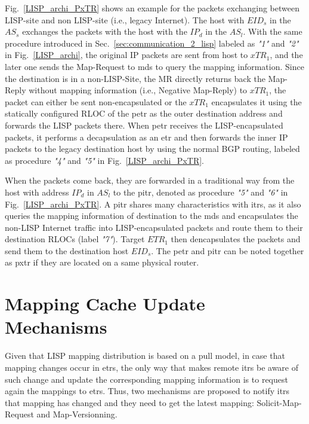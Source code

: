Fig.~\ref{LISP_archi_PxTR} shows an example for the packets exchanging between LISP-site and non LISP-site (i.e., legacy Internet). The host with $EID_s$ in the $AS_s$ exchanges the packets with the host with the $IP_d$ in the $AS_l$. With the same procedure introduced in Sec.~\ref{sec:communication_2_lisp} labeled as \emph{"1"} and \emph{"2"} in Fig.~\ref{LISP_archi}, the original IP packets are sent from host to $xTR_1$, and the later one sends the Map-Request to \acrshort{mds} to query the mapping information. Since the destination is in a non-LISP-Site, the MR directly returns back the Map-Reply without mapping information (i.e., Negative Map-Reply) to $xTR_1$, the packet can either be sent non-encapsulated or the $xTR_1$ encapsulates it using the statically configured RLOC of the \acrshort{petr} as the outer destination address and forwards the LISP packets there. When \acrshort{petr} receives the LISP-encapsulated packets, it performs a decapsulation as an \acrshort{etr} and then forwards the inner IP packets to the legacy destination host by using the normal BGP routing, labeled as procedure \emph{"4"} and \emph{"5"} in Fig.~\ref{LISP_archi_PxTR}. 

When the packets come back, they are forwarded in a traditional way from the host with address $IP_d$ in $AS_l$ to the \acrshort{pitr}, denoted as procedure \emph{"5"} and \emph{"6"} in Fig.~\ref{LISP_archi_PxTR}. A \acrshort{pitr} shares many characteristics with \acrshort{itr}s, as it also queries the mapping information of destination to the \acrshort{mds} and encapsulates the non-LISP Internet traffic into LISP-encapsulated packets and route them to their destination RLOCs (label \emph{"7"}). Target $ETR_1$ then dencapsulates the packets and send them to the destination host $EID_s$. The \acrshort{petr} and \acrshort{pitr} can be noted together as \acrshort{pxtr} if they are located on a same physical router.



\section{Mapping Cache Update Mechanisms}
\label{sec:updateMechanisms}
Given that LISP mapping distribution is based on a pull model, in case that mapping changes occur in \acrshort{etr}s, the only way that makes remote \acrshort{itr}s be aware of such change and update the corresponding mapping information is to request again the mappings to \acrshort{etr}s. Thus, two mechanisms are proposed to notify \acrshort{itr}s that mapping has changed and they need to get the latest mapping: Solicit-Map-Request and Map-Versionning.


